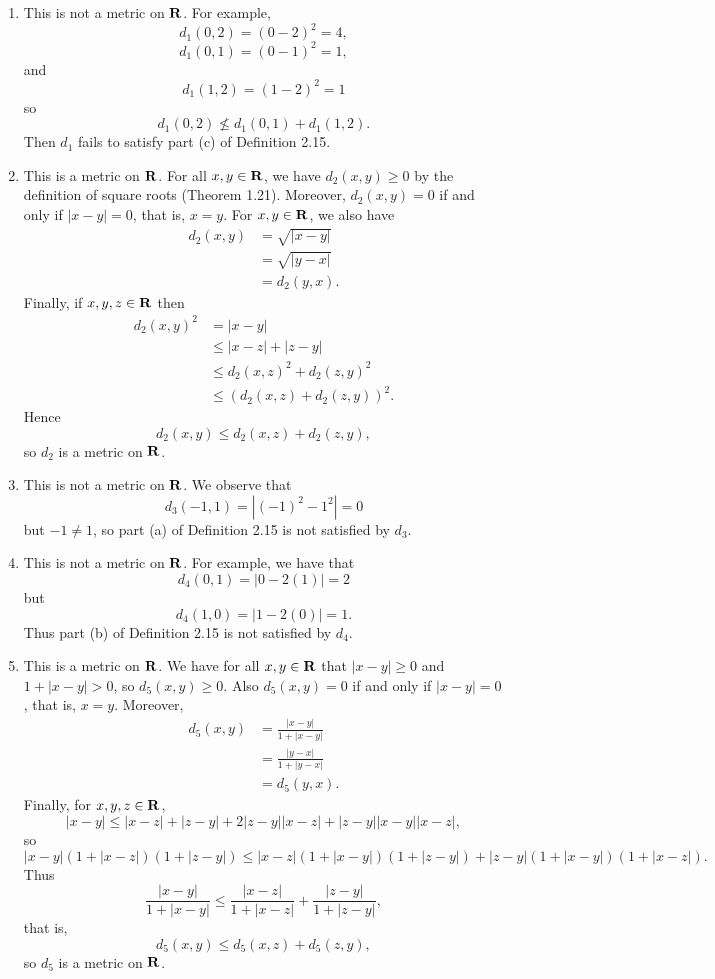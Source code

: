 \begin{ex}
\begin{enumerate}
\item This is not a metric on $\mathbf{R}$. For example, \[d_1(0, 2) = (0 - 2)^2 = 4,\] \[d_1(0, 1) = (0 - 1)^2 = 1,\] and \[d_1(1, 2) = (1 - 2)^2 = 1\] so \[d_1(0, 2) \not\leq d_1(0, 1) + d_1(1, 2).\] Then $d_1$ fails to satisfy part (c) of Definition 2.15.

\item This is a metric on $\mathbf{R}$. For all $x, y \in \mathbf{R}$, we have $d_2(x, y) \geq 0$ by the definition of square roots (Theorem 1.21). Moreover, $d_2(x, y) = 0$ if and only if $|x - y| = 0$, that is, $x = y$. For $x, y \in \mathbf{R}$, we also have
\begin{align*}
d_2(x, y) & = \sqrt{|x-y|}\\
& = \sqrt{|y-x|}\\
& = d_2(y, x).
\end{align*}
Finally, if $x, y, z \in \mathbf{R}$ then
\begin{align*}
d_2(x, y)^2 & = |x-y|\\
& \leq |x-z| + |z-y|\\
& \leq d_2(x, z)^2 + d_2(z, y)^2\\
& \leq (d_2(x, z) + d_2(z, y))^2.
\end{align*}
Hence \[d_2(x, y) \leq d_2(x, z) + d_2(z, y),\] so $d_2$ is a metric on $\mathbf{R}$.

\item This is not a metric on $\mathbf{R}$. We observe that \[d_3(-1, 1) = \left|(-1)^2 - 1^2\right| = 0\] but $-1 \not = 1$, so part (a) of Definition 2.15 is not satisfied by $d_3$.

\item This is not a metric on $\mathbf{R}$. For example, we have that \[d_4(0, 1) = |0 - 2(1)| = 2\] but \[d_4(1, 0) = |1 - 2(0)| = 1.\] Thus part (b) of Definition 2.15 is not satisfied by $d_4$.

\item This is a metric on $\mathbf{R}$. We have for all $x, y \in \mathbf{R}$ that $|x-y| \geq 0$ and $1 + |x-y| > 0$, so $d_5(x, y) \geq 0$. Also $d_5(x, y) = 0$ if and only if $|x-y| = 0$, that is, $x = y$. Moreover,
\begin{align*}
d_5(x, y) & = \frac{|x-y|}{1 + |x-y|}\\
& = \frac{|y-x|}{1 + |y-x|}\\
& = d_5(y, x).
\end{align*}
Finally, for $x, y, z \in \mathbf{R}$, \[|x-y| \leq |x-z| + |z-y| + 2|z-y||x-z| + |z-y||x-y||x-z|,\] so \[|x-y|(1 + |x-z|)(1 + |z-y|) \leq |x-z|(1 + |x-y|)(1 + |z-y|) + |z-y|(1 + |x-y|)(1 + |x-z|).\] Thus \[\frac{|x-y|}{1 + |x-y|} \leq \frac{|x-z|}{1 + |x-z|} + \frac{|z-y|}{1 + |z-y|},\] that is, \[d_5(x, y) \leq d_5(x, z) + d_5(z, y),\] so $d_5$ is a metric on $\mathbf{R}$.
\end{enumerate}
\end{ex}

